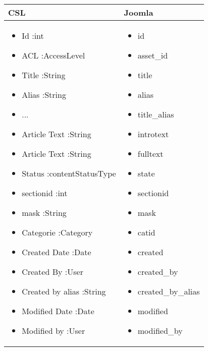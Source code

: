 \begin{minipage}{0.7\textwidth}
\begin{tabular}{|p{} | p{}|}
\hline
\textbf{CSL} & \textbf{Joomla} \\ 
\hline
\begin{itemize}
\item Id :int
\item ACL :AccessLevel
\item Title :String
\item Alias :String
\item ...
\item Article Text :String
\item Article Text :String
\item Status :contentStatusType
\item sectionid :int
 \item mask :String
\item Categorie :Category
\item Created Date :Date
\item Created By :User
\item Created by alias :String
\item Modified Date :Date
\item Modified by :User

\end{itemize}
 & 
 \begin{itemize}
\item id 
 \item asset\_id 
 \item title 
 \item alias 
 \item title\_alias 
 \item introtext 
 \item fulltext 
 \item state 
 \item sectionid 
 \item mask 
 \item catid 
 \item created 
 \item created\_by 
 \item created\_by\_alias 
 \item modified 
 \item modified\_by 
 
 \end{itemize} 
\\
\hline
\end{tabular}
\end{minipage}


